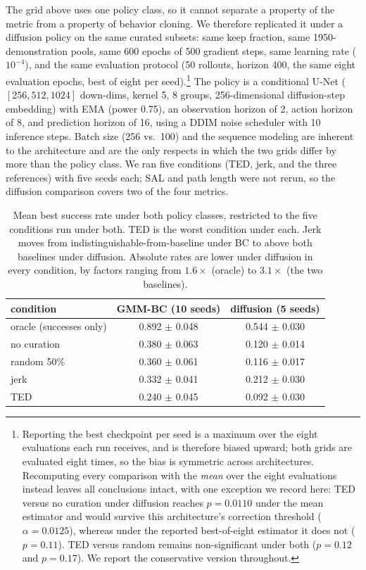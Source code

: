 \documentclass{article}
\begin{document}
The grid above uses one policy class, so it cannot separate a property of
the metric from a property of behavior cloning. We therefore replicated it
under a diffusion policy on the same curated subsets: same keep fraction,
same 1950-demonstration pools, same 600 epochs of 500 gradient steps, same
learning rate ($10^{-4}$), and the same evaluation protocol (50 rollouts,
horizon 400, the same eight evaluation epochs, best of eight per seed).\footnote{Reporting the best checkpoint per seed is a maximum over the
eight evaluations each run receives, and is therefore biased upward; both
grids are evaluated eight times, so the bias is symmetric across
architectures. Recomputing every comparison with the \emph{mean} over the
eight evaluations instead leaves all conclusions intact, with one exception
we record here: TED versus no curation under diffusion reaches
$p = 0.0110$ under the mean estimator and would survive this architecture's
correction threshold ($\alpha = 0.0125$), whereas under the reported
best-of-eight estimator it does not ($p = 0.11$). TED versus random remains
non-significant under both ($p = 0.12$ and $p = 0.17$). We report the
conservative version throughout.} The policy is a
conditional U-Net ($[256, 512, 1024]$ down-dims, kernel 5, 8 groups,
256-dimensional diffusion-step embedding) with EMA (power 0.75), an
observation horizon of 2, action horizon of 8, and prediction horizon of 16,
using a DDIM noise scheduler with 10 inference steps. Batch size (256
vs.\ 100) and the sequence modeling are inherent to the architecture and are
the only respects in which the two grids differ by more than the policy
class. We ran five conditions (TED, jerk, and the three references) with
five seeds each; SAL and path length were not rerun, so the diffusion
comparison covers two of the four metrics.

\begin{table}[t]
\centering
\small
\begin{tabular}{lcc}
\toprule
condition & GMM-BC (10 seeds) & diffusion (5 seeds) \\
\midrule
oracle (successes only) & 0.892 $\pm$ 0.048 & 0.544 $\pm$ 0.030 \\
\midrule
no curation             & 0.380 $\pm$ 0.063 & 0.120 $\pm$ 0.014 \\
random 50\%             & 0.360 $\pm$ 0.061 & 0.116 $\pm$ 0.017 \\
\midrule
jerk                    & 0.332 $\pm$ 0.041 & 0.212 $\pm$ 0.030 \\
TED                     & 0.240 $\pm$ 0.045 & 0.092 $\pm$ 0.030 \\
\bottomrule
\end{tabular}
\caption{Mean best success rate under both policy classes, restricted to the
five conditions run under both. TED is the worst condition under each. Jerk
moves from indistinguishable-from-baseline under BC to above both baselines
under diffusion. Absolute rates are lower under diffusion in every
condition, by factors ranging from $1.6\times$ (oracle) to $3.1\times$ (the
two baselines).}
\label{tab:crossarch}
\end{table}
\end{document}
